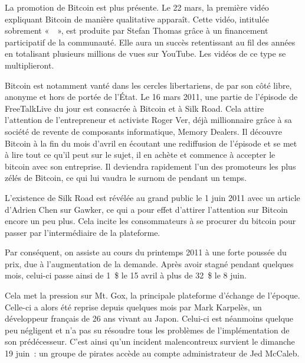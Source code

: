 
La promotion de Bitcoin est plus présente. Le 22 mars, la première vidéo expliquant Bitcoin de manière qualitative apparaît. Cette vidéo, intitulée sobrement «~~», est produite par Stefan Thomas grâce à un financement participatif de la communauté. Elle aura un succès retentissant au fil des années en totalisant plusieurs millions de vues sur YouTube. Les vidéos de ce type se multiplieront.

Bitcoin est notamment vanté dans les cercles libertariens, de par son côté libre, anonyme et hors de portée de l'État. Le 16 mars 2011, une partie de l'épisode de FreeTalkLive du jour est consacrée à Bitcoin et à Silk Road. Cela attire l'attention de l'entrepreneur et activiste Roger Ver, déjà millionnaire grâce à sa société de revente de composants informatique, Memory Dealers. Il découvre Bitcoin à la fin du mois d'avril en écoutant une rediffusion de l'épisode et se met à lire tout ce qu'il peut sur le sujet, il en achète et commence à accepter le bitcoin avec son entreprise. Il deviendra rapidement l'un des promoteurs les plus zélés de Bitcoin, ce qui lui vaudra le surnom de  pendant un temps.

L'existence de Silk Road est révélée au grand public le 1\ier{} juin 2011 avec un article d'Adrien Chen sur Gawker, ce qui a pour effet d'attirer l'attention sur Bitcoin encore un peu plus. Cela incite les consommateurs à se procurer du bitcoin pour passer par l'intermédiaire de la plateforme. %


Par conséquent, on assiste au cours du printemps 2011 à une forte poussée du prix, due à l'augmentation de la demande. Après avoir stagné pendant quelques mois, celui-ci passe ainsi de 1~\$ le 15 avril à plus de 32~\$ le 8 juin.


Cela met la pression sur Mt. Gox, la principale plateforme d'échange de l'époque. Celle-ci a alors été reprise depuis quelques mois par Mark Karpelès, un développeur français de 26 ans vivant au Japon. Celui-ci est néanmoins quelque peu négligent et n'a pas su résoudre tous les problèmes de l'implémentation de son prédécesseur. C'est ainsi qu'un incident malencontreux survient le dimanche 19 juin~: un groupe de pirates accède au compte administrateur de Jed McCaleb.

